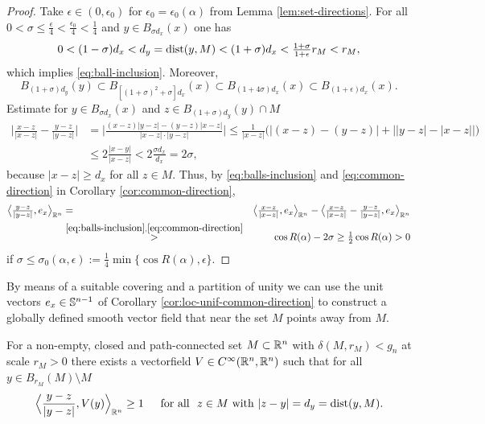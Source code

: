  \begin{proof}
Take $\epsilon\in (0,\epsilon_0)$ for $\epsilon_0=\epsilon_0(\alpha)$ from Lemma 
\ref{lem:set-directions}. 
For all $0<\sigma\le\frac{\epsilon}4<\frac{\epsilon_0}4<\frac14$ and 
$y\in B_{\sigma d_x}(x)$ one has 
$$
\textstyle
0< (1-\sigma)d_x<d_y=\dist(y,M)<(1+\sigma)d_x<\frac{1+\sigma}{1+\epsilon}r_M<r_M,
$$ 
which implies \eqref{eq:ball-inclusion}.
Moreover, 
\begin{equation}\label{eq:balls-inclusion}
B_{(1+\sigma)d_y}(y)\subset B_{[(1+\sigma)^2+\sigma]d_x}(x)
\subset B_{(1+4\sigma)d_x}(x)\subset B_{(1+\epsilon)d_x}(x).
\end{equation}
Estimate for $y\in B_{\sigma d_x}(x)$ and $z\in B_{(1+\sigma)d_y}(y)\cap M$
\begin{align*}
\textstyle
\big|\frac{x-z}{|x-z|}-
\frac{y-z}{|y-z|}\big|&
\textstyle
=\big|\frac{(x-z)|y-z|-(y-z)|x-z|}{|x-z|\cdot |y-z|}\big|
\textstyle
\le \frac1{|x-z|}\big(|(x-z)-(y-z)|+\big| |y-z|-|x-z|\big|\big)\\
&\textstyle
\le 2\frac{|x-y|}{|x-z|}<2\frac{\sigma d_x}{d_x}=2\sigma,
\end{align*}
because $|x-z|\ge d_x$ for all $z\in M$. Thus, by \eqref{eq:balls-inclusion} and 
\eqref{eq:common-direction} in Corollary \ref{cor:common-direction},
\begin{eqnarray*}
\textstyle
\big\langle\frac{y-z}{|y-z|},e_x\big\rangle_{\R^n}& =  &
\textstyle
\big\langle\frac{x-z}{|x-z|},e_x\big\rangle_{\R^n}- 
\big\langle\frac{x-z}{|x-z|}-\frac{y-z}{|y-z|},e_x\big\rangle_{\R^n}\\
 &\overset{\eqref{eq:balls-inclusion},\eqref{eq:common-direction}}{>} & 
 \textstyle
 \cos 
R(\alpha)-2\sigma\ge\frac12\cos R(\alpha)>0
\end{eqnarray*}
if $\sigma\le\sigma_0(\alpha,\epsilon):=\frac14 \min\{\cos R(\alpha),\epsilon\}.$
 \end{proof}
 By means of a suitable covering and a partition of unity we can use the unit vectors
 $e_x\in\S^{n-1}$ of Corollary \ref{cor:loc-unif-common-direction} to construct a
 globally defined smooth vector field that near the set $M$ points away from $M$.
 \begin{proposition}
 \label{prop:vf}
For a non-empty,  closed and path-connected set $M\subset\R^n$ with
$\delta(M,r_M)<g_n$ at scale $r_M>0$ there exists a vectorfield
$V\in C^\infty(\R^n,\R^n)$ such that for all $y\in B_{r_M}(M)\setminus M$
\begin{equation}\label{eq:vf}
\Big\langle\frac{y-z}{|y-z|},V(y)\Big\rangle_{\R^n}\ge 1\quad
\Foa  z\in M\,\,\textnormal{with}\,\,
|z-y|=d_y=\dist(y,M).
\end{equation}
 \end{proposition}
